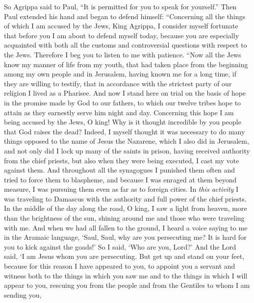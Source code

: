 \begin{biblechapter} %
 So Agrippa said to Paul, “It is permitted for you to speak for yourself.” Then Paul extended his hand and began to defend himself:
\verse “Concerning all the things of which I am accused by the Jews, King Agrippa, I consider myself fortunate that before you I am about to defend myself today,
\verse because you are especially acquainted with both all the customs and controversial questions with respect to the Jews. Therefore I beg you to listen to me with patience.
\verse “Now all the Jews know my manner of life from my youth, that had taken place from the beginning among my own people and in Jerusalem,
\verse having known me for a long time, if they are willing to testify, that in accordance with the strictest party of our religion I lived as a Pharisee.
\verse And now I stand here on trial on the basis of hope in the promise made by God to our fathers,
\verse to which our twelve tribes hope to attain as they earnestly serve him night and day. Concerning this hope I am being accused by the Jews, O king!
\verse Why is it thought incredible by you people that God raises the dead?
\verse Indeed, I myself thought it was necessary to do many things opposed to the name of Jesus the Nazarene,
\verse which I also did in Jerusalem, and not only did I lock up many of the saints in prison, having received authority from the chief priests, but also when they were being executed, I cast my vote against them.
\verse And throughout all the synagogues I punished them often and tried to force them to blaspheme, and because I was enraged at them beyond measure, I was pursuing them even as far as to foreign cities.
\verse In \textit{this activity} I was traveling to Damascus with the authority and full power of the chief priests.
\verse In the middle of the day along the road, O king, I saw a light from heaven, more than the brightness of the sun, shining around me and those who were traveling with me.
\verse And when we had all fallen to the ground, I heard a voice saying to me in the Aramaic language, ‘Saul, Saul, why are you persecuting me? It is hard for you to kick against the goads!’
\verse So I said, ‘Who are you, Lord?’ And the Lord said, ‘I am Jesus whom you are persecuting.
\verse But get up and stand on your feet, because for this reason I have appeared to you, to appoint you a servant and witness both to the things in which you saw me and to the things in which I will appear to you,
\verse rescuing you from the people and from the Gentiles to whom I am sending you,

\end{biblechapter}
